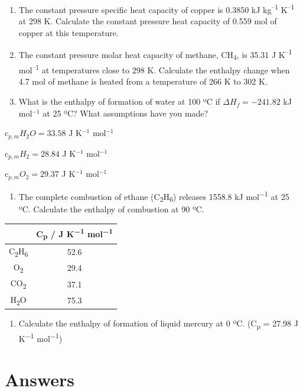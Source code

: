 \documentclass[
]{book}
\providecommand{\tightlist}{%
  \setlength{\itemsep}{0pt}\setlength{\parskip}{0pt}}
\begin{document}
\begin{enumerate}
\def\labelenumi{\arabic{enumi}.}
\item
  The constant pressure specific heat capacity of copper is 0.3850 kJ kg\textsuperscript{--1} K\textsuperscript{--1} at 298 K. Calculate the constant pressure heat capacity of 0.559 mol of copper at this temperature.
\item
  The constant pressure molar heat capacity of methane, CH\textsubscript{4}, is 35.31 J K\textsuperscript{--1} mol\textsuperscript{--1} at temperatures close to 298 K. Calculate the enthalpy change when 4.7 mol of methane is heated from a temperature of 266 K to 302 K.
\item
  What is the enthalpy of formation of water at 100 ºC if \(\Delta H_f = -241.82\) kJ mol\(^{-1}\) at 25 ºC? What assumptions have you made?
\end{enumerate}

c\(_{p,m} H_2 O = 33.58\) J K\(^{-1}\) mol\(^{-1}\)

c\(_{p,m} H_2 = 28.84\) J K\(^{-1}\) mol\(^{-1}\)

c\(_{p,m} O_2 = 29.37\) J K\(^{-1}\) mol\(^{-1}\)

\begin{enumerate}
\def\labelenumi{\arabic{enumi}.}
\setcounter{enumi}{3}
\tightlist
\item
  The complete combustion of ethane (C\textsubscript{2}H\textsubscript{6}) releases 1558.8 kJ mol\textsuperscript{−1} at 25 ºC. Calculate the enthalpy of combustion at 90 ºC.
\end{enumerate}

\begin{longtable}[]{@{}cc@{}}
\toprule
& C\textsubscript{p} / J K\textsuperscript{−1} mol\textsuperscript{−1}\tabularnewline
\midrule
\endhead
C\textsubscript{2}H\textsubscript{6} & 52.6\tabularnewline
O\textsubscript{2} & 29.4\tabularnewline
CO\textsubscript{2} & 37.1\tabularnewline
H\textsubscript{2}O & 75.3\tabularnewline
\bottomrule
\end{longtable}

\begin{enumerate}
\def\labelenumi{\arabic{enumi}.}
\setcounter{enumi}{4}
\tightlist
\item
  Calculate the enthalpy of formation of liquid mercury at 0 ºC. (C\textsubscript{p} = 27.98 J K\textsuperscript{−1} mol\textsuperscript{−1})
\end{enumerate}

\hypertarget{sec:w2p2ans}{%
\section{Answers}\label{sec:w2p2ans}}
\end{document}
